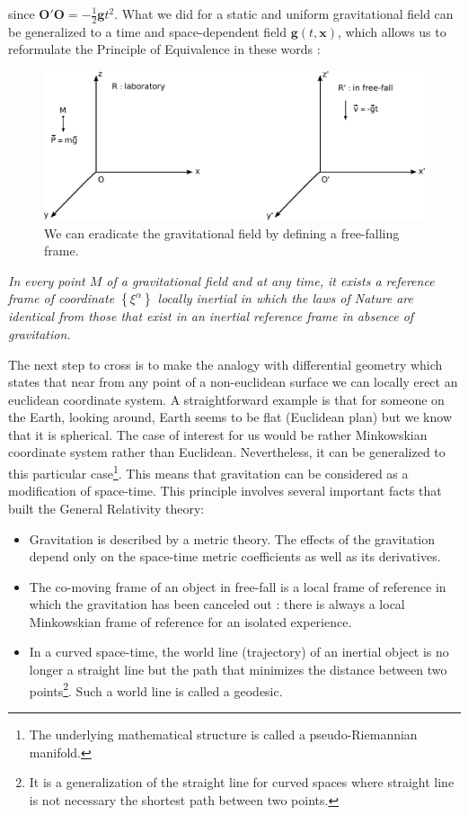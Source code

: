 %
since $\mathbf{O'O} = -\frac{1}{2}\mathbf{g}t^2$.
What we did for a static and uniform gravitational field can be generalized to a time and space-dependent field
$\mathbf{g}(t,\mathbf{x})$, which allows us to reformulate the Principle of Equivalence in these words :
%
\begin{figure}
\begin{center}
\includegraphics[width=\textwidth]{equivalence_principle.pdf}
\end{center}
\caption{We can eradicate the gravitational field by defining a free-falling frame.}
\label{equivalence_illus}
\end{figure}
\begin{center}
%
\textit{In every point $M$ of a gravitational field and at any time, it exists a reference frame of coordinate $\left\{\xi^\alpha\right\}$ locally
inertial in which the laws of Nature are
identical from those that exist in an inertial reference frame in absence of gravitation.}
\end{center}
%
The next step to cross is to make the analogy with differential geometry which states that near from any point
of a non-euclidean surface we can locally erect an euclidean coordinate system.
A straightforward example is that for someone on the Earth, looking around, Earth seems to be flat (Euclidean plan) but we know that it is spherical.
The case of interest for us would be rather Minkowskian coordinate system rather than Euclidean. Nevertheless, it can be generalized to this particular
case\footnote{The underlying mathematical structure is called a pseudo-Riemannian manifold.}.
This means that gravitation can be considered as a modification of space-time.
This principle involves several important facts that built the General Relativity theory:
%
\begin{itemize}
%
\item Gravitation is described by a metric theory. The effects of the gravitation depend only on the space-time metric coefficients as well as its derivatives.
\item The co-moving frame of an object in free-fall is a local frame of reference
in which the gravitation has been canceled out : there is always a local Minkowskian frame of reference for an isolated experience.
\item In a curved space-time, the world line (trajectory) of an inertial object is no longer a
straight line but the path that minimizes the distance between two points\footnote{It is a generalization of the straight line
for curved spaces where straight line is not necessary the shortest path between two points.}. Such a world line is called a geodesic.
%
\end{itemize}

